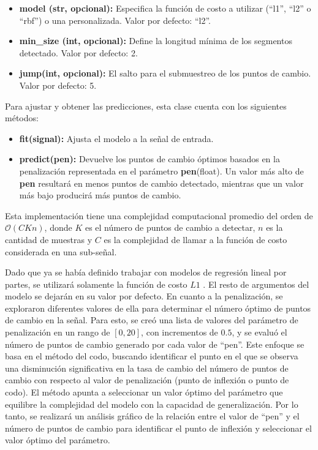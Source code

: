 \documentclass{article}[14pts]
\begin{document}
      \begin{itemize}
        \item \textbf{model (str, opcional):} Especifica la función de costo a utilizar (``l1'', ``l2'' o ``rbf'') o una personalizada. Valor por defecto: ``l2''.
         
        \item  \textbf{min\_size (int, opcional):} Define la longitud mínima de los segmentos detectado. Valor por defecto: 2.
        
        \item \textbf{jump(int, opcional):} El salto para el submuestreo de los puntos de cambio. Valor por defecto: 5.

      \end{itemize}

    Para ajustar y obtener las predicciones, esta clase cuenta con los siguientes métodos:

      \begin{itemize}

        \item \textbf{fit(signal):} Ajusta el modelo a la señal de entrada.
        
        \item \textbf{predict(pen):} Devuelve los puntos de cambio óptimos basados en la penalización representada en el parámetro \textbf{pen}(float). Un valor más alto de \textbf{pen} resultará en menos puntos de cambio detectado, mientras que un valor más bajo producirá más puntos de cambio. 
      \end{itemize}

    Esta implementación tiene una complejidad computacional promedio del orden de $\mathcal{O}(CKn)$, donde $K$ es el número de puntos de cambio a detectar, $n$ es la cantidad de muestras y $C$ es la complejidad de llamar a la función de costo considerada en una sub-señal. 

    Dado que ya se había definido trabajar con modelos de regresión lineal por partes, se utilizará solamente la función de costo $L1$ . El resto de argumentos del modelo se dejarán en su valor por defecto. En cuanto a la penalización, se exploraron diferentes valores de ella para determinar el número óptimo de puntos de cambio en la señal. Para esto, se creó una lista de valores del parámetro de penalización en un rango de $[0, 20]$, con incrementos de $0.5$, y se evaluó el número de puntos de cambio generado por cada valor de ``pen''. Este enfoque se basa en el método del codo, buscando identificar el punto en el que se observa una disminución significativa en la tasa de cambio del número de puntos de cambio con respecto al valor de penalización (punto de inflexión o punto de codo). El método apunta a seleccionar un valor óptimo del parámetro que equilibre la complejidad del modelo con la capacidad de generalización. Por lo tanto, se realizará un análisis gráfico de la relación entre el valor de ``pen'' y el número de puntos de cambio para identificar el punto de inflexión y seleccionar el valor óptimo del parámetro.
\end{document}
